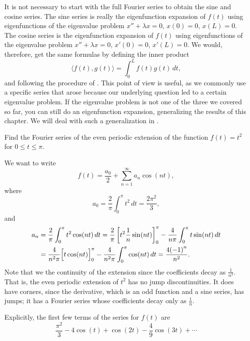 It is not necessary to start with the full Fourier series to obtain
the sine and cosine series.
The sine series is really the eigenfunction expansion of $f(t)$ using 
eigenfunctions of the eigenvalue problem $x''+\lambda x = 0$, $x(0) = 0$,
$x(L) = 0$.  The cosine series is the eigenfunction expansion of $f(t)$
using 
eigenfunctions of the eigenvalue problem $x''+\lambda x = 0$, $x'(0) = 0$,
$x'(L) = 0$.  We would, therefore, get the same formulas
by defining the inner product
\begin{equation*}
\langle f(t), g(t) \rangle = \int_0^L f(t) g(t) \, dt ,
\end{equation*}
and following the procedure of .  This point of view is
useful, as we commonly use a specific series that arose because our underlying
question 
led to a certain eigenvalue problem.  If the eigenvalue 
problem is not one of the three we covered so far, you can still do an
eigenfunction expansion, generalizing the results of this chapter.  We will
deal with such a generalization in .


\begin{example}
Find the Fourier series of the even periodic extension of 
the function $f(t) = t^2$ for $0 \leq t \leq \pi$.

We want to write
\begin{equation*}
f(t) = \frac{a_0}{2} + \sum_{n=1}^\infty a_n \cos (n t) ,
\end{equation*}
where
\begin{equation*}
a_0 = \frac{2}{\pi}
\int_0^\pi t^2 \, dt = \frac{2 \pi^2}{3} ,
\end{equation*}
and
\begin{equation*}
\begin{split}
a_n & = \frac{2}{\pi}
\int_0^\pi t^2 \cos (n t) \, dt
= \frac{2}{\pi} \left[ t^2 \frac{1}{n} \sin (nt) \right]_0^\pi -
\frac{4}{n\pi}
\int_0^\pi t \sin (n t) \, dt \\
& = 
\frac{4}{n^2\pi}
\Bigl[ t \cos (n t) \Bigr]_0^\pi
-
\frac{4}{n^2\pi}
\int_0^\pi \cos (n t) \, dt
= 
\frac{4{(-1)}^n}{n^2} .
\end{split}
\end{equation*}
Note that we  the continuity of the extension since the
coefficients decay as $\frac{1}{n^2}$.  That is, the even periodic extension
of $t^2$ has no jump discontinuities.  It does have corners, since
the derivative, which is an odd function and a sine series, has jumps; it has
a Fourier series whose coefficients decay only as $\frac{1}{n}$.

Explicitly, the first few terms of the series for $f(t)$ are
\begin{equation*}
\frac{\pi^2}{3} - 4 \cos (t) + \cos (2t) - \frac{4}{9} \cos (3t) + \cdots
\end{equation*}
\end{example}

